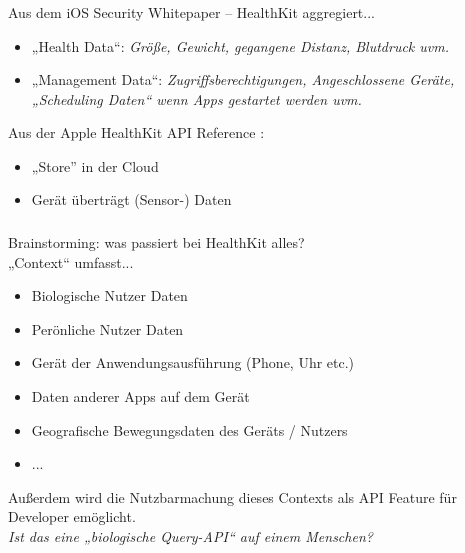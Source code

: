 \begin{frame}
    \frametitle{\insertsubsection}
    Aus dem iOS Security Whitepaper \cite{iosSecurity} -- HealthKit aggregiert...
    \vspace{.8em}
    \begin{itemize}
        \setlength\itemsep{0.6em}
        \item „Health Data“: \emph{Größe, Gewicht, gegangene Distanz, Blutdruck uvm.}
        \item „Management Data“: \emph{Zugriffsberechtigungen, Angeschlossene Geräte, „Scheduling Daten“ wenn Apps gestartet werden uvm.}
    \end{itemize}
    \vspace{.8em}
    Aus der Apple HealthKit API Reference \cite{hkApi}:
    \vspace{.8em}
    \begin{itemize}
        \setlength\itemsep{0.6em}
        \item „Store” in der Cloud
        \item Gerät überträgt (Sensor-) Daten
    \end{itemize}
\end{frame}

\begin{frame}
    \frametitle{\insertsubsection}
    Brainstorming: was passiert bei HealthKit alles?\\
    \vspace{.6em}
    „Context“ umfasst...
    \vspace{.6em}
    \begin{itemize}[<+->]
        \setlength\itemsep{0.5em}
        \item Biologische Nutzer Daten
        \item Perönliche Nutzer Daten
        \item Gerät der Anwendungsausführung (Phone, Uhr etc.)
        \item Daten anderer Apps auf dem Gerät
        \item Geografische Bewegungsdaten des Geräts / Nutzers
        \item ...
    \end{itemize}
    \pause
    \vspace{.6em}
    Außerdem wird die Nutzbarmachung dieses Contexts als API Feature für Developer emöglicht.\\
    \pause
    \vspace{.6em}
    \emph{Ist das eine „biologische Query-API“ auf einem Menschen?}
\end{frame}